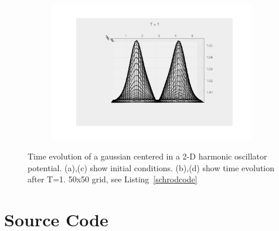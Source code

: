 \documentclass[paper=a4, fontsize=11pt, abstract=on]{scrartcl} %
\numberwithin{equation}{section}
\numberwithin{figure}{section}
\numberwithin{table}{section}
\begin{document}
\begin{figure}
\begin{subfigure}[b]{0.48\textwidth}
    \caption{}
    \label{fig:pert3}
  \end{subfigure}
  ~
  \begin{subfigure}[b]{0.48\textwidth}
    \includegraphics[width=\textwidth]{wirepert1}
    \caption{}
    \label{fig:pert4}
  \end{subfigure}
  \caption{Time evolution of a gaussian centered in a 2-D harmonic oscillator potential. (a),(c) show initial conditions. (b),(d) show time evolution after T=1. 50x50 grid, see Listing~\ref{schrodcode}}
  \label{fig:pert}
\end{figure}






\appendix

\section{Source Code}
\label{sec:code}




 
\end{document}
